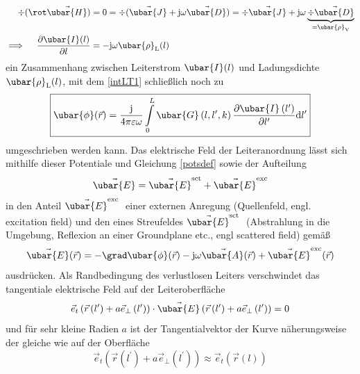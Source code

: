 \begin{align}
	 \div(\rot \vec{\ubar{H}})&=0=\div(\vec{\ubar{J}}+\mathrm{j} \omega \vec{\ubar{D}})=\div \vec{\ubar{J}}+\mathrm{j} \omega \underbrace{\div \vec{\ubar{D}}}_{=\ubar{\rho}_{\mathrm{V}}}  \\
	 \implies\quad\frac{\partial \ubar{I}(l)}{\partial l}&=-\mathrm{j} \omega \ubar{\rho}_{\mathrm{L}}(l) 
\end{align}
ein Zusammenhang zwischen Leiterstrom $\ubar{I}(l)$ und Ladungsdichte $\ubar{\rho}_{\mathrm{L}}(l)$, mit dem \ref{intLT1} schließlich noch zu
\begin{equation}\label{phileiter}
	\boxed{\ubar{\phi}(\vec{r})=\frac{\mathrm{j}}{4 \pi \varepsilon \omega} \int\limits_{0}^{L} \ubar{G}\left(l, l^{\prime}, k\right) \frac{\partial \ubar{I}\left(l^{\prime}\right)}{\partial l^{\prime}} \mathrm{d} l^{\prime}} 
\end{equation}
umgeschrieben werden kann. Das elektrische Feld der Leiteranordnung lässt sich mithilfe dieser Potentiale und Gleichung \ref{potsdef} sowie der Aufteilung
\begin{equation}
	\vec{\ubar{E}}=\vec{\ubar{E}}^{\mathrm{sct}}+\vec{\ubar{E}}^{\mathrm{exc}} 
\end{equation}
in den Anteil $\vec{\ubar{E}}^{\text {exc }}$ einer externen Anregung (Quellenfeld, engl. excitation field) und den eines Streufeldes $\vec{\ubar{E}}^{\text {sct }}$ (Abstrahlung in die Umgebung, Reflexion an einer Groundplane etc., engl scattered field) gemäß
\begin{equation}
	\vec{\ubar{E}}(\vec{r})=-\grad \ubar{\phi}(\vec{r})-\mathrm{j} \omega \vec{\ubar{A}}(\vec{r})+\vec{\ubar{E}}^{\operatorname{exc}}(\vec{r}) 
\end{equation}
ausdrücken. Als Randbedingung des verlustlosen Leiters verschwindet das tangentiale elektrische Feld auf der Leiteroberfläche %
\begin{equation}\label{RBLT1}
	\vec{e}_{t}\left(\vec{r}\left(l^{\prime}\right)+a \vec{e}_{\perp}\left(l^{\prime}\right)\right) \cdot \vec{\ubar{E}}\left(\vec{r}\left(l^{\prime}\right)+a \vec{e}_{\perp}\left(l^{\prime}\right)\right)=0 
\end{equation}
und für sehr kleine Radien $a$ ist der Tangentialvektor der Kurve näherungsweise der gleiche wie auf der Oberfläche
\begin{equation}
	\vec{e}_{t}\left(\vec{r}\left(l^{\prime}\right)+a \vec{e}_{\perp}\left(l^{\prime}\right)\right) \approx \vec{e}_{t}(\vec{r}(l)) 
\end{equation}
